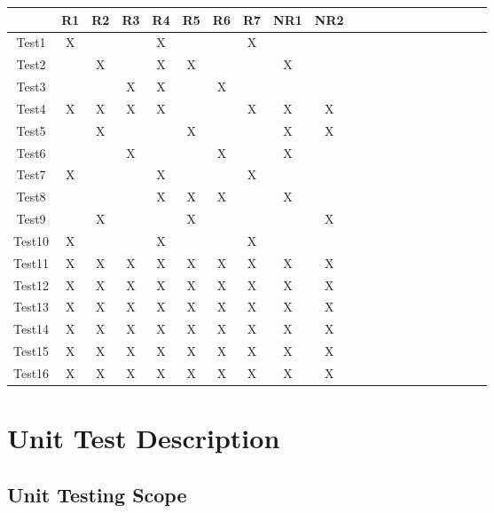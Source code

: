 \documentclass[12pt, titlepage]{article}
\begin{document}

\begin{table}[h!]
	\centering
	\begin{tabular}{|c|c|c|c|c|c|c|c|c|c|c|c|c|c|c|c|c|c|c|c|c|}
		\hline        
		& R1 & R2 & R3 & R4 & R5 & R6 & R7 & NR1 & NR2 \\
		\hline
		Test1        & X& & & X& & & X& &  \\ \hline
		Test2             & & X& & X& X& & & X&  \\ \hline
		Test3             & & & X& X& & X& & & \\ \hline
		Test4      &X &X &X &X & & &X&X&X\\ \hline
		Test5         & &X & & &X & & &X &X  \\ \hline
		Test6         & & &X & & &X & &X & \\ \hline
		Test7   & X& & & X& & & X& & \\ \hline
		Test8        & & & &X &X &X & &X & \\ \hline
		Test9         & &X & & &X & & & &X   \\ \hline
		Test10        &X & & &X & & &X & &   \\ \hline
		Test11         &X &X &X &X &X &X &X &X &X  \\ \hline
		Test12          &X &X &X &X &X &X &X &X &X   \\ \hline
		Test13          &X &X &X &X &X &X &X &X &X  \\ \hline
		Test14          &X &X &X &X &X &X &X &X &X   \\ \hline
		Test15          &X &X &X &X &X &X &X &X &X   \\ \hline
		Test16          &X &X &X &X &X &X &X &X &X   \\ \hline
	\end{tabular}
\end{table}

\section{Unit Test Description}


\subsection{Unit Testing Scope}
\end{document}
